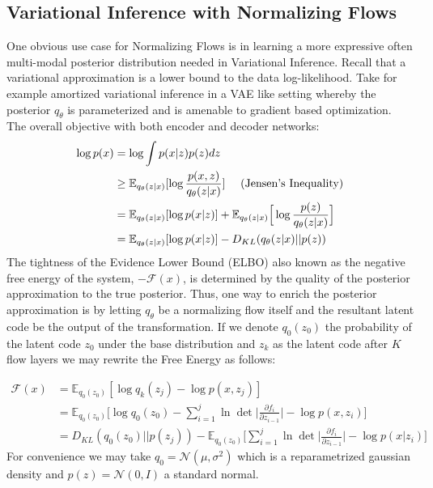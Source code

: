 \subsection{Variational Inference with Normalizing Flows}
One obvious use case for Normalizing Flows is in learning a more expressive often multi-modal posterior distribution needed in Variational Inference. Recall that a variational approximation is a lower bound to the data log-likelihood. Take for example amortized variational inference in a VAE like setting whereby the posterior $q_{\theta}$ is parameterized and is amenable to gradient based optimization. The overall objective with both encoder and decoder networks:
\begin{align}
    \log p(x) & = \log \int p(x|z)p(z) dz \\
              & \geq \mathbb{E}_{q_{\theta}(z|x)}[\log \frac{p(x,z)}{q_{\theta}(z|x)}] \ \ \ \  (\textnormal{Jensen's Inequality}) \\
              & = \mathbb{E}_{q_{\theta}(z|x)} [\log p(x|z)] + \mathbb{E}_{q_{\theta}(z|x)}\Big[\log \frac{p(z)}{q_{\theta}(z|x)}\Big] \\
              & = \mathbb{E}_{q_{\theta}(z|x)} [\log p(x|z)] - D_{KL}(q_{\theta}(z|x) || p(z)) \label{nn_vae_perspective}
\end{align}
The tightness of the Evidence Lower Bound (ELBO) also known as the negative free energy of the system, $-\mathcal{F}(x)$, is determined by the quality of the posterior approximation to the true posterior. Thus, one way to enrich the posterior approximation is by letting $q_{\theta}$ be a normalizing flow itself and the resultant latent code be the output of the transformation. If we denote $q_0(z_0)$ the probability of the latent code $z_0$ under the base distribution and $z_k$ as the latent code after $K$ flow layers we may rewrite the Free Energy as follows:

\begin{align}
    \mathcal{F}(x) &= \mathbb{E}_{q_{0}(z_0)}[\log q_k(z_j) - \log p(x,z_j)] \\
    &= \mathbb{E}_{q_{0}(z_0)}\Big[\log q_0(z_0) - \sum_{i=1}^j\ln \det \Big \lvert \frac{\partial f_i}{\partial z_{i-1}} \Big \rvert - \log p(x,z_i)\Big]\\
    &= D_{KL}(q_0(z_0)|| p(z_j)) - \mathbb{E}_{q_{0}(z_0)}\Big[\sum_{i=1}^j\ln \det \Big \lvert \frac{\partial f_i}{\partial z_{i-1}} \Big \rvert - \log p(x|z_i)\Big]
\end{align}
For convenience we may take $q_0 = \mathcal{N}(\mu, \sigma^2)$ which is a reparametrized gaussian density and $p(z) = \mathcal{N}(0, I)$ a standard normal. 

